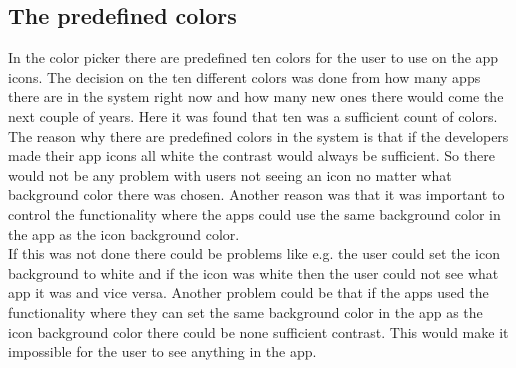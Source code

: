 \subsection{ The predefined colors} 
In the color picker there are predefined ten colors for the user to use on the app icons. The decision on the ten different colors was done from how many apps there are in the \giraf[] system right now and how many new ones there would come the next couple of years. Here it was found that ten was a sufficient count of colors. \\
The reason why there are predefined colors in the \giraf[] system is that if the developers made their app icons all white the contrast would always be sufficient. So there would not be any problem with users not seeing an icon no matter what background color there was chosen.  Another reason was that it was important to control the functionality where the apps could use the same background color in the app as the icon background color. \\
If this was not done there could be problems like e.g. the user could set the icon background to white and if the icon was white then the user could not see what app it was and vice versa. Another problem could be that if the apps used the functionality where they can set the same background color in the app as the icon background color there could be none sufficient contrast. This would make it impossible for the user to see anything in the app.

